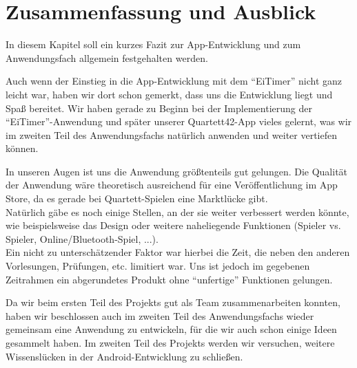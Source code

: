 \chapter{Zusammenfassung und Ausblick}
\label{cha:zusammenfassungUndAusblick}

In diesem Kapitel soll ein kurzes Fazit zur App-Entwicklung und zum Anwendungsfach allgemein festgehalten werden. 

Auch wenn der Einstieg in die App-Entwicklung mit dem ``EiTimer'' nicht ganz leicht war, haben wir dort schon gemerkt, dass uns die Entwicklung liegt und Spaß bereitet. Wir haben gerade zu Beginn bei der Implementierung der ``EiTimer''-Anwendung und später unserer Quartett42-App vieles gelernt, was wir im zweiten Teil des Anwendungsfachs natürlich anwenden und weiter vertiefen können.

In unseren Augen ist uns die Anwendung größtenteils gut gelungen. Die Qualität der Anwendung wäre theoretisch ausreichend für eine Veröffentlichung im App Store, da es gerade bei Quartett-Spielen eine Marktlücke gibt.\\ Natürlich gäbe es noch einige Stellen, an der sie weiter verbessert werden könnte, wie beispielsweise das Design oder weitere naheliegende Funktionen (Spieler vs. Spieler, Online/Bluetooth-Spiel, ...).\\ Ein nicht zu unterschätzender Faktor war hierbei die Zeit, die neben den anderen Vorlesungen, Prüfungen, etc. limitiert war. Uns ist jedoch im gegebenen Zeitrahmen ein abgerundetes Produkt ohne ``unfertige'' Funktionen gelungen.

Da wir beim ersten Teil des Projekts gut als Team zusammenarbeiten konnten, haben wir beschlossen auch im zweiten Teil des Anwendungsfachs wieder gemeinsam eine Anwendung zu entwickeln, für die wir auch schon einige Ideen gesammelt haben. Im zweiten Teil des Projekts werden wir versuchen, weitere Wissenslücken in der Android-Entwicklung zu schließen.